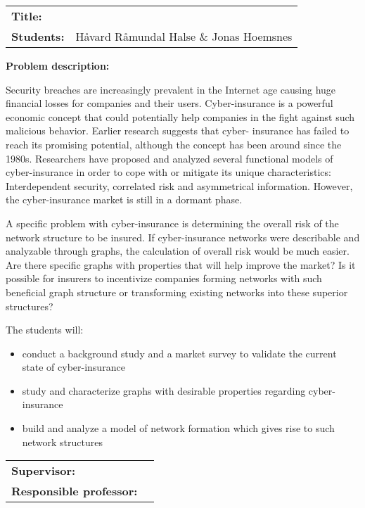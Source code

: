 \begin{titlingpage}

\noindent
\begin{tabular}{@{}p{4cm}l}
\textbf{Title:} 	& \thetitle \\
\textbf{Students:}	& Håvard Råmundal Halse \& Jonas Hoemsnes \\
\end{tabular}

\vspace{4ex}
\noindent\textbf{Problem description:}

Security breaches are increasingly prevalent in the Internet age causing huge financial losses for companies and their users. Cyber-insurance is a powerful economic concept that could potentially help companies in the fight against such malicious behavior. Earlier research suggests that cyber-
insurance has failed to reach its promising potential, although the concept has been around since the 1980s. Researchers have proposed and analyzed several functional models of cyber-insurance in order to cope with or mitigate its unique characteristics: Interdependent security, correlated risk and asymmetrical information. However, the cyber-insurance market is still in a dormant phase.

A specific problem with cyber-insurance is determining the overall risk of the network structure to be insured. If cyber-insurance networks were describable and analyzable through graphs, the calculation of overall risk would be much easier. Are there specific graphs with properties that will help improve the market? Is it possible for insurers to incentivize companies forming networks with such beneficial graph structure or transforming existing networks into these superior structures?

The students will:

\begin{itemize}
 
\item conduct a background study and a market survey to validate the current state of cyber-insurance
\item study and characterize graphs with desirable properties regarding cyber-insurance
\item build and analyze a model of network formation which gives rise to such network structures
\end{itemize}


\vspace{2ex}

\noindent
\begin{tabular}{@{}p{4cm}l}
\textbf{Supervisor:}			& \thesupervisor \\
\textbf{Responsible professor:} 	& \theprofessor \\
\end{tabular}

\end{titlingpage}
